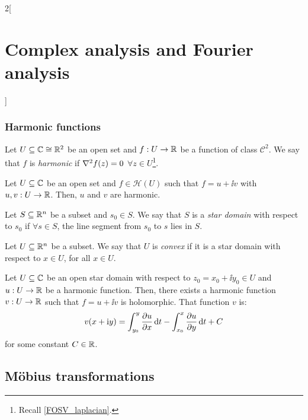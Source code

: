 \documentclass[../../../main.tex]{subfiles}
\begin{document}
\begin{multicols}{2}[\section{Complex analysis and Fourier analysis}]
  \subsubsection{Harmonic functions}
  \begin{definition}
    Let $U\subseteq \mathbb{C}\cong\mathbb{R}^2$ be an open set and $f:U\rightarrow \mathbb{R}$ be a function of class $\mathcal{C}^2$. We say that $f$ is \emph{harmonic} if $\laplacian f(z)=0$ $\forall z\in U$\footnote{Recall \cref{FOSV_laplacian}.}.
  \end{definition}
  \begin{proposition}
    Let $U\subseteq \mathbb{C}$ be an open set and $f\in\mathcal{H}(U)$ such that $f=u+\ii v$ with $u,v:U\rightarrow\mathbb{R}$. Then, $u$ and $v$ are harmonic.
  \end{proposition}
  \begin{definition}
    Let $S\subseteq\mathbb{R}^n$ be a subset and $s_0\in S$. We say that $S$ is a \emph{star domain} with respect to $s_0$ if $\forall s\in S$, the line segment from $s_0$ to $s$ lies in $S$.
  \end{definition}
  \begin{definition}
    Let $U\subseteq\mathbb{R}^n$ be a subset. We say that $U$ is \emph{convex} if it is a star domain with respect to $x\in U$, for all $x\in U$.
  \end{definition}
  \begin{proposition}
    Let $U\subseteq \mathbb{C}$ be an open star domain with respect to $z_0=x_0+\ii y_0\in U$ and $u:U\rightarrow\mathbb{R}$ be a harmonic function. Then, there exists a harmonic function $v:U\rightarrow\mathbb{R}$ such that $f=u+\ii v$ is holomorphic. That function $v$ is:
    $$v(x+\mathrm{i} y)=\int_{y_0}^y\pdv{u}{x}(x+\mathrm{i} t)\dd{t}-\int_{x_0}^x\pdv{u}{y}(t+\mathrm{i} y_0)\dd{t}+C$$
    for some constant $C\in\mathbb{R}$.
  \end{proposition}
  \subsection{Möbius transformations}

\end{multicols}
\end{document}
